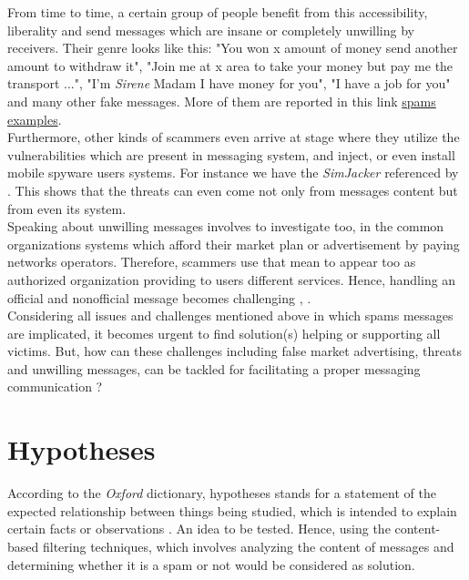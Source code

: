\documentclass[12pt,a4paper, oneside]{book}
\begin{document}
	From time to time, a certain group of people benefit from this accessibility, liberality and send messages which are insane or completely unwilling by receivers. Their genre looks like this: "You won x amount of money send another amount to withdraw it", "Join me at x area to take your money but pay me the transport ...", "I'm \textit{Sirene} Madam I have money for you", "I have a job for you" and many other fake messages. More of them are reported in this link  \href{ https://blog.textedly.com/spam-text-message-examples}{spams examples}.  \\
		
	Furthermore, other kinds of scammers even arrive at stage where they utilize the vulnerabilities which are present in messaging system, and inject, or even install mobile spyware users systems. For instance we have the \textit{SimJacker} referenced by \citet{cimpanu2019simjacker}. This shows that the threats can even come not only from messages content but from even its system. \\
	
	Speaking about unwilling messages involves to investigate too, in the common organizations systems which afford their market plan or advertisement by paying networks operators. Therefore, scammers use that mean to appear too as authorized organization providing to users different services. Hence, handling an official and nonofficial message becomes challenging \citep{chen2017survey}, \citep{leppaniemi2008mobile}.\\
		
	Considering all issues and challenges mentioned above in which spams messages are implicated, it becomes urgent to find solution(s) helping or supporting all victims. But, how can these challenges including false market advertising, threats and unwilling messages, can be tackled for facilitating a proper messaging communication ?	
	\section{Hypotheses}  
	 According to the \textit{Oxford} dictionary, hypotheses stands for a statement of the expected relationship between things being studied, which is intended to explain certain facts or observations \citep{park2012dictionary}. An idea to be tested.
	 Hence, using the content-based filtering techniques, which involves analyzing the content of messages and determining whether it is a spam or not would be considered as solution. \\
	 
\end{document}
